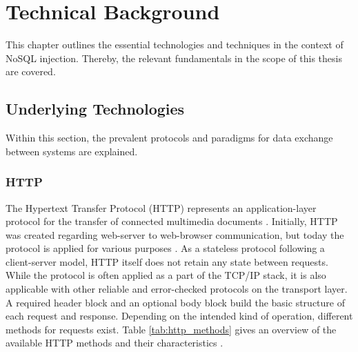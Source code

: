  \chapter{Technical Background}
\label{cha:technicalBackground}
This chapter outlines the essential technologies and techniques in the context of NoSQL injection. Thereby, the relevant fundamentals in the scope of this thesis are covered.

\section{Underlying Technologies}
Within this section, the prevalent protocols and paradigms for data exchange between systems are explained.

\subsection{HTTP}
The Hypertext Transfer Protocol (HTTP) represents an application-layer protocol for the transfer of connected multimedia documents \cite{Berners-Lee1996}. Initially, HTTP was created regarding web-server to web-browser communication, but today the protocol is applied for various purposes \cite{Fielding:1999}. As a stateless protocol following a client-server model, HTTP itself does not retain any state between requests. While the protocol is often applied as a part of the TCP/IP stack, it is also applicable with other reliable and error-checked protocols on the transport layer. A required header block and an optional body block build the basic structure of each request and response. Depending on the intended kind of operation, different methods for requests exist. Table \ref{tab:http_methods} gives an overview of the available HTTP methods and their characteristics \cite{Fielding:1999}.\\

